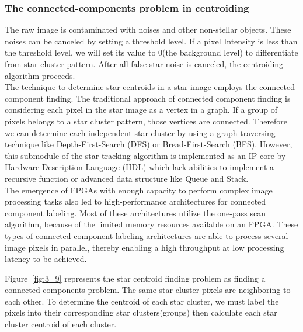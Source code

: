 \subsubsection{The connected-components problem in centroiding}

The raw image is contaminated with noises and other non-stellar objects. These noises can be canceled by setting a threshold level. If a pixel Intensity is less than the threshold level, we will set its value to 0(the background level) to differentiate from star cluster pattern. After all false star noise is canceled, the centroiding algorithm proceeds. \\

\noindent The technique to determine star centroids in a star image employs the connected component finding. The traditional approach of connected component finding is considering each pixel in the star image as a vertex in a graph. If a group of pixels belongs to a star cluster pattern, those vertices are connected. Therefore we can determine each independent star cluster by using a graph traversing technique like Depth-First-Search (DFS) or Bread-First-Search (BFS). However, this submodule of the star tracking algorithm is implemented as an IP core by Hardware Description Language (HDL) which lack abilities to implement a recursive function or advanced data structure like Queue and Stack. \\

\noindent The emergence of FPGAs with enough capacity to perform complex image processing tasks also led to high-performance architectures for connected component labeling\cite{CCA}. Most of these architectures utilize the one-pass scan algorithm, because of the limited memory resources available on an FPGA. These types of connected component labeling architectures are able to process several image pixels in parallel, thereby enabling a high throughput at low processing latency to be achieved\cite{000384075100011n.d.}. \\


\noindent Figure~\ref{fig:3_9} represents the star centroid finding problem as finding a connected-components problem. The same star cluster pixels are neighboring to each other. To determine the centroid of each star cluster, we must label the pixels into their corresponding star clusters(groups) then calculate each star cluster centroid of each cluster. \\


